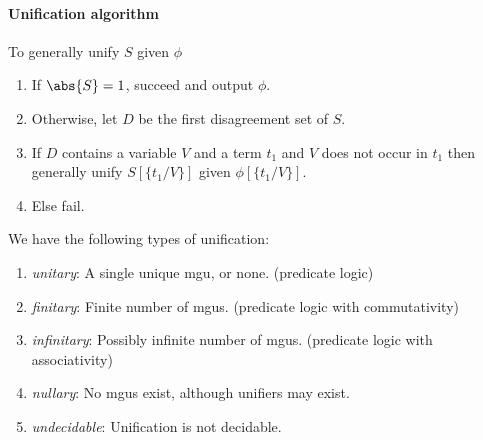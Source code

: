 \documentclass{article}
\begin{document}
\paragraph{Unification algorithm}

To generally unify $S$ given $\phi$
\begin{enumerate}
    \item If $\abs{S}=1$, succeed and output $\phi$.
    \item Otherwise, let $D$ be the first disagreement set of $S$.
    \item If $D$ contains a variable $V$ and a term $t_1$ and $V$
          does not occur in $t_1$ then generally unify $S[\{t_1/V\}]$ given $\phi[\{t_1/V\}]$.
    \item Else fail.
\end{enumerate}

\begin{definition}
    We have the following types of unification:
    \begin{enumerate}
        \item \emph{unitary}: A single unique mgu, or none. (predicate logic)
        \item \emph{finitary}: Finite number of mgus. (predicate logic with commutativity)
        \item \emph{infinitary}: Possibly infinite number of mgus. (predicate logic with associativity)
        \item \emph{nullary}: No mgus exist, although unifiers may exist.
        \item \emph{undecidable}: Unification is not decidable.
    \end{enumerate}
\end{definition}
\end{document}
